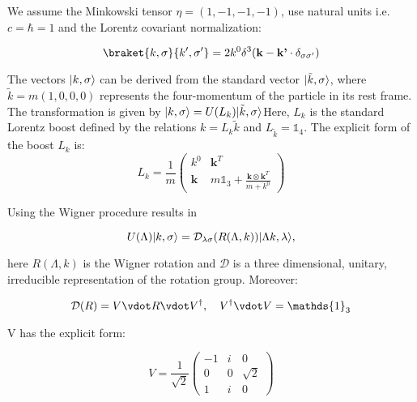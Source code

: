 We assume the Minkowski tensor $\eta = (1,-1,-1,-1)$, use natural units i.e. $c = \hbar = 1$ and the Lorentz covariant normalization: 

\begin{equation}
    \braket{k,\sigma}{k',\sigma'} = 2 k^0 \delta^3(\textbf{k} - \textbf{k'} \cdot \delta_{\sigma\sigma'})
\end{equation}

\baselineskip

The vectors $\lvert k,\sigma\rangle$ can be derived from the standard vector $\lvert\tilde{k},\sigma\rangle$, where $\tilde{k} = m(1,0,0,0)$ represents the four-momentum of the particle in its rest frame. 
The transformation is given by $\lvert k,\sigma\rangle = U(L_k)\lvert\tilde{k},\sigma\rangle$Here, $L_k$ is the standard Lorentz boost defined by the relations $k = L_k\tilde{k}$ and $L_{\tilde{k}} = \mathds{1}_4$.
The explicit form of the boost $L_k$ is:
\\
\begin{equation}
    L_k = \frac{1}{m}\begin{pmatrix}
        k^0 & \textbf{k}^T \\
        \textbf{k} & m \mathds{1}_3+\frac{\textbf{k}\otimes \textbf{k}^T}{m+k^0} 
        \end{pmatrix}
\end{equation}

Using the Wigner procedure results in

\begin{equation}
    U(\Lambda)\lvert k,\sigma\rangle = \mathcal{D}_{\lambda\sigma}(R(\Lambda,k))\lvert\Lambda k,\lambda\rangle,
\end{equation}

here $R(\Lambda,k)$ is the Wigner rotation and $\mathcal{D}$ is a three dimensional, unitary, irreducible representation of the rotation group.
Moreover:

\begin{equation}
    \mathcal{D}(R) = V \vdot R \vdot V^\dagger, \quad V^\dagger\vdot V = \mathds{1}_3
\end{equation}

V has the explicit form:

\begin{equation}
    V = \frac{1}{\sqrt{2}}\begin{pmatrix}
        -1 & i & 0 \\
        0 & 0 & \sqrt{2} \\
        1 & i & 0 
        \end{pmatrix}
\end{equation}

